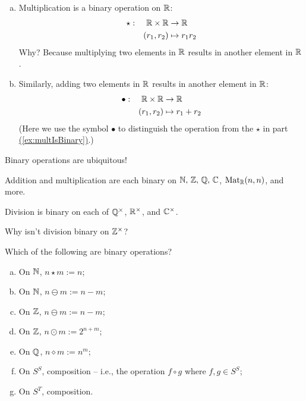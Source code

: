 \documentclass[../algebraNotesMSRI-UP2016.tex]{subfiles}
\begin{document}
\begin{frame}
\begin{ex}
\begin{enumerate}[(a)]
\item\label{ex:multIsBinary} Multiplication is a binary operation on $\mathbb R$:
\begin{alignat*}{3}
\star: && \mathbb R\times \mathbb R & \to \mathbb R \\
	&& (r_1,r_2) & \mapsto r_1r_2
\end{alignat*}
Why?  Because multiplying two elements in $\mathbb R$ results in another element in $\mathbb R$.
\item Similarly, adding two elements in $\mathbb R$ results in another element in $\mathbb R$: 
\begin{alignat*}{3}
\bullet: && \mathbb R\times \mathbb R & \to \mathbb R \\
	&& (r_1,r_2) & \mapsto r_1+r_2
\end{alignat*}  
(Here we use the symbol $\bullet$ to distinguish the operation from the $\star$ in part \hyperref[ex:multIsBinary]{(\ref{ex:multIsBinary})}.)
\end{enumerate}
\end{ex}
\end{frame}

\begin{frame}%
Binary operations are ubiquitous!

\smallGap
\begin{ex}
Addition and multiplication are each binary on $\mathbb N,\,\mathbb Z,\,\mathbb Q,\,\mathbb C$, $\operatorname{Mat}_{\mathbb R}(n,n)$, and more.  
\end{ex}

\smallGap
\begin{ex}
Division is binary on each of $\mathbb Q^{\times}$, $\mathbb R^{\times}$, and $\mathbb C^{\times}$.     
\end{ex}

\smallGap
\begin{que}
Why isn't division binary on $\mathbb Z^{\times}$?   
\end{que}
\end{frame}

\begin{frame}%
\begin{exe}[cf. Problem 39]\label{exe:binary}
Which of the following are binary operations?
\begin{enumerate}[(a)]
\item On $\mathbb N$, $n\star m:=n$;
\item On $\mathbb N$, $n\ominus m:=n-m$;
\item On $\mathbb Z$, $n\ominus m:=n-m$;
\item On $\mathbb Z$, $n\odot m:=2^{n+m}$;
\item On $\mathbb Q$, $n\diamond m :=n^m$;
\item On $S^S$, composition -- i.e., the operation $f\circ g$ where $f,g\in S^S$;
\item On $S^T$, composition.
\end{enumerate}
\end{exe}
\end{frame}
\end{document}
